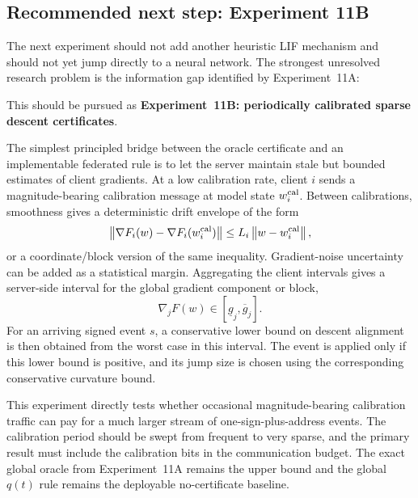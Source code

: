 \subsection{Recommended next step: Experiment 11B}

The next experiment should not add another heuristic LIF mechanism and should not yet jump directly to a neural network. The strongest unresolved research problem is the information gap identified by Experiment~11A:
\begin{center}
\end{center}
This should be pursued as \textbf{Experiment~11B: periodically calibrated sparse descent certificates}.

The simplest principled bridge between the oracle certificate and an implementable federated rule is to let the server maintain stale but bounded estimates of client gradients. At a low calibration rate, client $i$ sends a magnitude-bearing calibration message at model state $w_i^{\rm cal}$. Between calibrations, smoothness gives a deterministic drift envelope of the form
\begin{equation}
  \left\lVert\nabla F_i(w)-\nabla F_i(w_i^{\rm cal})\right\rVert
  \leq
  L_i\left\lVert w-w_i^{\rm cal}\right\rVert,
\end{equation}
or a coordinate/block version of the same inequality. Gradient-noise uncertainty can be added as a statistical margin. Aggregating the client intervals gives a server-side interval for the global gradient component or block,
\begin{equation}
  \nabla_jF(w)\in[\underline g_j,\overline g_j].
\end{equation}
For an arriving signed event $s$, a conservative lower bound on descent alignment is then obtained from the worst case in this interval. The event is applied only if this lower bound is positive, and its jump size is chosen using the corresponding conservative curvature bound.

This experiment directly tests whether occasional magnitude-bearing calibration traffic can pay for a much larger stream of one-sign-plus-address events. The calibration period should be swept from frequent to very sparse, and the primary result must include the calibration bits in the communication budget. The exact global oracle from Experiment~11A remains the upper bound and the global $q(t)$ rule remains the deployable no-certificate baseline.

